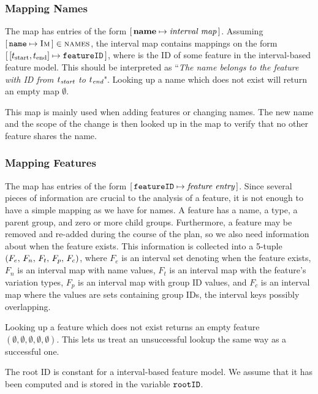\subsubsection{Mapping Names}
\label{ssub:mapping-names}

The \names{} map has entries of the form $[ \,\textbf{name}{} \mapsto \textit{interval map}\, ]$. Assuming $[ \,\texttt{name} \mapsto \textsc{Im}\, ] \in \textsc{names}$, the interval map  contains mappings on the form $\intervalmapping{t_\text{start}}{t_\text{end}}{\var{featureID}}$, where  is the ID of some feature in the interval-based feature model. This should be interpreted as ``\emph{The name \emph{} belongs to the feature with ID \emph{} from $t_{\emph{\text{start}}}$ to $t_{\emph{\text{end}}}$}". Looking up a name which does not exist will return an empty map $\emptyset$. 

This map is mainly used when adding features or changing names. The new name and the scope of the change is then looked up in the \names{} map to verify that no other feature shares the name.

\subsubsection{Mapping Features}
\label{ssub:mapping-features}

The \features{} map has entries of the form $[ \,\texttt{featureID} \mapsto \textit{feature entry}\, ]$. Since several pieces of information are crucial to the analysis of a feature, it is not enough to have a simple mapping as we have for names.
A feature has a name, a type, a parent group, and zero or more child groups. Furthermore, a feature may be removed and re-added during the course of the plan, so we also need information about when the feature exists.
This information is collected into a 5-tuple $\left(F_e,\, F_n,\, F_t,\, F_p,\, F_c\right)$, where $F_e$ is an interval set denoting when the feature exists, $F_n$ is an interval map with name values, $F_t$ is an interval map with the feature's variation types, $F_p$ is an interval map with group ID values, and $F_c$ is an interval map where the values are sets containing group IDs, the interval keys possibly overlapping.

Looking up a feature which does not exist returns an empty feature $(\emptyset \comma \emptyset \comma \emptyset \comma \emptyset \comma \emptyset)$. This lets us treat an unsuccessful lookup the same way as a successful one.

The root ID is constant for a interval-based feature model. We assume that it has been computed and is stored in the variable $\texttt{rootID}$. 

